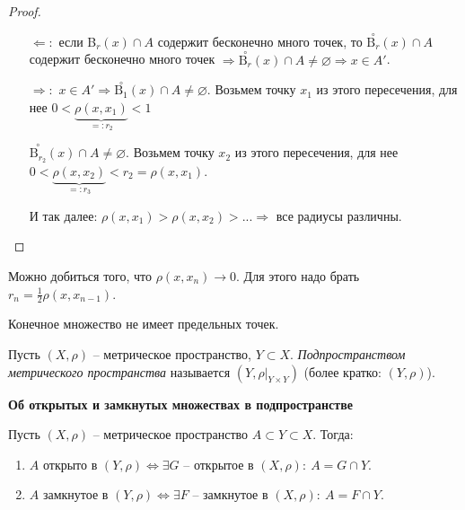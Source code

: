 \begin{proof}~
\begin{enumerate}
    \item[$\Leftarrow:$] если B$_r(x)\cap A$ содержит бесконечно много точек, то $\overset{\circ}{\text{B}_r}(x)\cap A$ содержит  бесконечно много точек $\Rightarrow\overset{\circ}{\text{B}_r}(x)\cap A\neq \varnothing\Rightarrow x\in A'$.

    \item[$\Rightarrow:$] $x\in A'\Rightarrow \overset{\circ}{\text{B}_1}(x)\cap A\neq \varnothing$. Возьмем точку $x_1$ из этого пересечения, для нее $0<\underbrace{\rho(x, x_1)}_{=:r_2}<1$

    $\overset{\circ}{\text{B}_{r_2}}(x)\cap A\neq \varnothing$. Возьмем точку $x_2$ из этого пересечения, для нее $0<\underbrace{\rho(x, x_2)}_{=:r_3}<r_2=\rho(x, x_1)$.

    И так далее: $\rho(x, x_1)>\rho(x, x_2)>...\Rightarrow$ все радиусы различны.
\end{enumerate}
\end{proof}

\begin{remark}
    Можно добиться того, что $\rho(x, x_n)\rightarrow 0$. Для этого надо брать $r_n=\frac{1}{2}\rho(x, x_{n-1})$.
\end{remark}

\begin{corollary}
    Конечное множество не имеет предельных точек.
\end{corollary}

\begin{definition}
    Пусть $(X, \rho)$ – метрическое пространство, $Y\subset X$. \textit{Подпространством метрического пространства} называется $(Y, \rho|_{Y\times Y})$ (более кратко: $(Y, \rho)$).
\end{definition}

\begin{theorem}
    \textbf{Об открытых и замкнутых множествах в подпространстве}

    Пусть $(X, \rho)$ – метрическое пространство $A\subset Y\subset X$. Тогда:
    \begin{enumerate}
        \item $A$ открыто в $(Y, \rho)\Leftrightarrow \exists G$ – открытое в $(X, \rho):\ A=G \cap Y$.
        \item $A$ замкнутое в $(Y, \rho)\Leftrightarrow \exists F$ – замкнутое в $(X, \rho):\ A=F \cap Y$.
    \end{enumerate}
\end{theorem}

